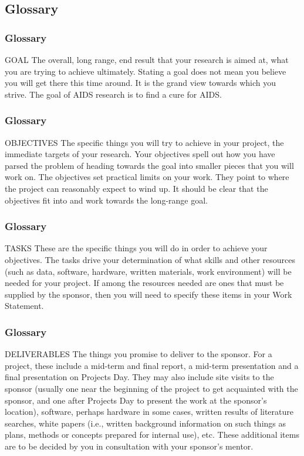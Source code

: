 \subsection{Glossary}

\begin{frame}[allowframebreaks]
    \frametitle{Glossary}
    \begin{block}
        {GOAL} The overall, long range, end result that your research is aimed at, what
you are trying to achieve ultimately. Stating a goal does not mean you believe
you will get there this time around. It is the grand view towards which you
strive. The goal of AIDS research is to find a cure for AIDS.
\end{block}
\end{frame}

\begin{frame}
    \frametitle{Glossary}
    \begin{block}
        {OBJECTIVES} The specific things you will try to achieve in your project, the
immediate targets of your research. Your objectives spell out how you have
parsed the problem of heading towards the goal into smaller pieces that you
will work on. The objectives set practical limits on your work. They point to
where the project can reasonably expect to wind up. It should be clear that
the objectives fit into and work towards the long-range goal.
\end{block}
\end{frame}

\begin{frame}
    \frametitle{Glossary}
\begin{block}
        {TASKS} These are the specific things you will do in order to achieve your
objectives. The tasks drive your determination of what skills and other
resources (such as data, software, hardware, written materials, work
environment) will be needed for your project. If among the resources needed
are ones that must be supplied by the sponsor, then you will need to specify
these items in your Work Statement.
\end{block}
    
\end{frame}


\begin{frame}
    \frametitle{Glossary}
\begin{block}
        {DELIVERABLES} The things you promise to deliver to the sponsor. For a 
project, these include a mid-term and final report, a mid-term presentation
and a final presentation on Projects Day. They may also include site visits to
the sponsor (usually one near the beginning of the project to get acquainted
with the sponsor, and one after Projects Day to present the work at the
sponsor's location), software, perhaps hardware in some cases, written results
of literature searches, white papers (i.e., written background information on
such things as plans, methods or concepts prepared for internal use), etc.
These additional items are to be decided by you in consultation with your
sponsor’s mentor.
\end{block}
    
\end{frame}

